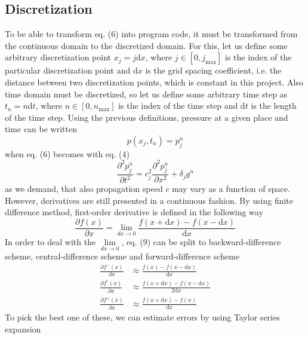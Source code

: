 \documentclass[]{article}
\begin{document}
\subsection{Discretization}
To be able to transform eq. (6) into program code, it must be transformed from the continuous domain to the discretized domain. For this, let us define some arbitrary discretization point $x_j=j\textrm{d}x$, where $j\in\left[0,j_\textrm{max}\right]$ is the index of the particular discretization point and $\textrm{d}x$ is the grid spacing coefficient, i.e. the distance between two discretization points, which is constant in this project. Also time domain must be discretized, so let us define some arbitrary time step as $t_n=n\textrm{d}t$, where $n\in\left[0,n_\textrm{max}\right]$ is the index of the time step and $\textrm{d}t$ is the length of the time step. Using the previous definitions, pressure at a given place and time can be written
\begin{equation}
	p\left(x_j,t_n\right)=p^n_j
\end{equation}
when eq. (6) becomes with eq. (4)
\begin{equation}
	\frac{\partial^2 p^n_j}{\partial t^2}=c^2_j\frac{\partial^2 p^n_j}{\partial x^2}+\delta_j g^n
\end{equation}
as we demand, that also propagation speed $c$ may vary as a function of space. However, derivatives are still presented in a continuous fashion. By using finite difference method, first-order derivative is defined in the following way
\begin{equation}
	\frac{\partial f\left(x\right)}{\partial x}=\lim\limits_{dx \rightarrow 0}\frac{f\left(x+\textrm{d}x\right)-f\left(x-\textrm{d}x\right)}{\textrm{d}x}
\end{equation} 
In order to deal with the $\lim\limits_{dx \rightarrow 0}$, eq. (9) can be split to backward-difference scheme, central-difference scheme and forward-difference scheme 
\begin{align*}
	\frac{\partial f^-\left(x\right)}{\partial x}&\approx\frac{f\left(x\right)-f\left(x-\textrm{d}x\right)}{\textrm{d}x} \\
	\frac{\partial f^c\left(x\right)}{\partial x}&\approx\frac{f\left(x+\textrm{d}x\right)-f\left(x-\textrm{d}x\right)}{2\textrm{d}x} \\
	\frac{\partial f^+\left(x\right)}{\partial x}&\approx\frac{f\left(x+\textrm{d}x\right)-f\left(x\right)}{\textrm{d}x}
\end{align*}
To pick the best one of these, we can estimate errors by using Taylor series expansion
\end{document}
